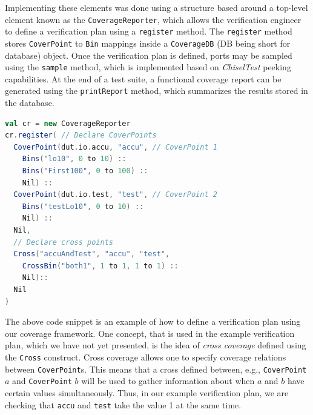 \documentclass[runningheads]{llncs}
\begin{document}
Implementing these elements was done using a structure based around a top-level element known as the \texttt{CoverageReporter}, which allows the verification engineer to define a verification plan using a \texttt{register} method. The \texttt{register} method stores \texttt{CoverPoint} to \texttt{Bin} mappings inside a \texttt{CoverageDB} (DB being short for database) object. Once the verification plan is defined, ports may be sampled using the \texttt{sample} method, which is implemented based on \textit{ChiselTest} peeking capabilities. At the end of a test suite, a functional coverage report can be generated using the \texttt{printReport} method, which summarizes the results stored in the database.

\begin{lstlisting}[language=scala]
val cr = new CoverageReporter
cr.register( // Declare CoverPoints
  CoverPoint(dut.io.accu, "accu", // CoverPoint 1
    Bins("lo10", 0 to 10) ::
    Bins("First100", 0 to 100) ::
    Nil) ::
  CoverPoint(dut.io.test, "test", // CoverPoint 2
    Bins("testLo10", 0 to 10) ::
    Nil) ::
  Nil,
  // Declare cross points
  Cross("accuAndTest", "accu", "test", 
    CrossBin("both1", 1 to 1, 1 to 1) ::
    Nil)::
  Nil
)
\end{lstlisting}

The above code snippet is an example of how to define a verification plan using our coverage framework. One concept, that is used in the example verification plan, which we have not yet presented, is the idea of \textit{cross coverage} defined using the \texttt{Cross} construct. Cross coverage allows one to specify coverage relations between \texttt{CoverPoint}s. This means that a cross defined between, e.g., \texttt{CoverPoint} $a$ and \texttt{CoverPoint} $b$ will be used to gather information about when $a$ and $b$ have certain values simultaneously. Thus, in our example verification plan, we are checking that \texttt{accu} and \texttt{test} take the value 1 at the same time.
\end{document}
